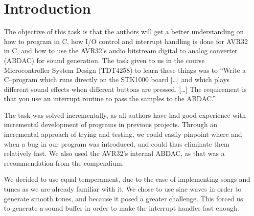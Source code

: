 \section{Introduction}

The objective of this task is that the authors will get a better
understanding on how to program in C, how I/O control and interrupt
handling is done for AVR32 in C, and how to use the AVR32's audio
bitstream digital to analog converter (ABDAC) for sound generation. The
task given to us in the course Microcontroller System Design (TDT4258)
to learn these things was to ``Write a C–program which runs directly on
the STK1000 board [\ldots] and which plays different sound effects when
different buttons are pressed. [\ldots] The requirement is that you use
an interrupt routine to pass the samples to the ABDAC.''\cite{comp}

The task was solved incrementally, as all authors have had good
experience with incremental development of programs in previous
projects. Through an incremental approach of trying and testing, we
could easily pinpoint where and when a bug in our program was
introduced, and could thus eliminate them relatively fast. We also used
the AVR32's internal ABDAC, as that was a recommendation from the
compendium.

We decided to use equal temperament, due to the ease of implementing
songs and tunes as we are already familiar with it. We chose to use sine
waves in order to generate smooth tones, and because it posed a greater
challenge. This forced us to generate a sound buffer in order to make
the interrupt handler fast enough.
